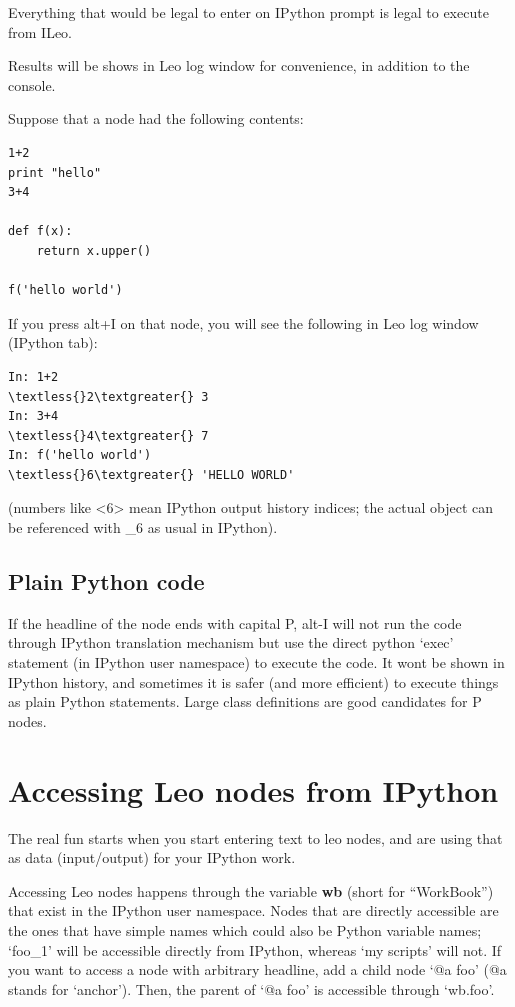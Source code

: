 \documentclass[a4paper,10pt,english]{sphinxmanual}
\begin{document}
Everything that would be legal to enter on IPython prompt is legal to execute
from ILeo.

Results will be shows in Leo log window for convenience, in addition to the console.

Suppose that a node had the following contents:

\begin{Verbatim}[commandchars=\\\{\}]
1+2
print "hello"
3+4

def f(x):
    return x.upper()

f('hello world')
\end{Verbatim}

If you press alt+I on that node, you will see the following in Leo log window (IPython tab):

\begin{Verbatim}[commandchars=\\\{\}]
In: 1+2
\textless{}2\textgreater{} 3
In: 3+4
\textless{}4\textgreater{} 7
In: f('hello world')
\textless{}6\textgreater{} 'HELLO WORLD'
\end{Verbatim}

(numbers like \textless{}6\textgreater{} mean IPython output history indices; the actual object can be
referenced with \_6 as usual in IPython).


\subsection{Plain Python code}
\label{IPythonBridge:plain-python-code}
If the headline of the node ends with capital P, alt-I will not run the code
through IPython translation mechanism but use the direct python `exec' statement
(in IPython user namespace) to execute the code. It wont be shown in IPython
history, and sometimes it is safer (and more efficient) to execute things as
plain Python statements. Large class definitions are good candidates for P
nodes.


\section{Accessing Leo nodes from IPython}
\label{IPythonBridge:accessing-leo-nodes-from-ipython}
The real fun starts when you start entering text to leo nodes, and are using
that as data (input/output) for your IPython work.

Accessing Leo nodes happens through the variable \textbf{wb} (short for ``WorkBook'')
that exist in the IPython user namespace. Nodes that are directly accessible are
the ones that have simple names which could also be Python variable names;
`foo\_1' will be accessible directly from IPython, whereas `my scripts' will not.
If you want to access a node with arbitrary headline, add a child node `@a foo'
(@a stands for `anchor'). Then, the parent of `@a foo' is accessible through
`wb.foo'.
\end{document}
